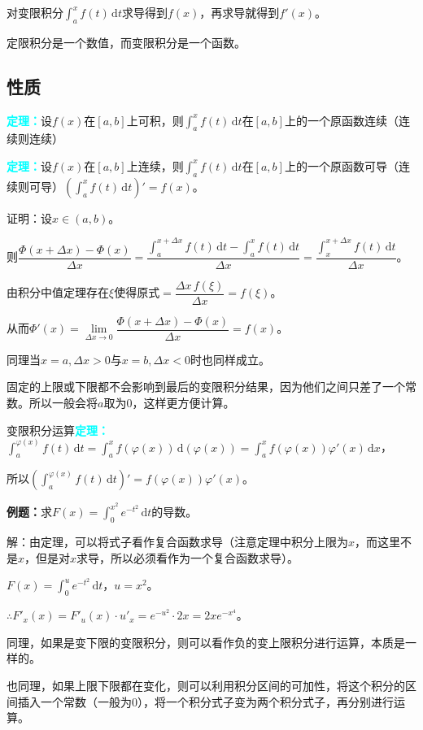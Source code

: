 \documentclass[UTF8, 12pt]{ctexart}
\begin{document}
对变限积分$\int_{a}^xf(t)\,\textrm{d}t$求导得到$f(x)$，再求导就得到$f'(x)$。

定限积分是一个数值，而变限积分是一个函数。

\subsection{性质}

\textcolor{aqua}{\textbf{定理：}}设$f(x)$在$[a,b]$上可积，则$\int_a^xf(t)\,\textrm{d}t$在$[a,b]$上的一个原函数连续（连续则连续）

\textcolor{aqua}{\textbf{定理：}}设$f(x)$在$[a,b]$上连续，则$\int_a^xf(t)\,\textrm{d}t$在$[a,b]$上的一个原函数可导（连续则可导）$(\int_a^xf(t)\,\textrm{d}t)'=f(x)$。

证明：设$x\in(a,b)$。

则$\dfrac{\Phi(x+\Delta x)-\Phi(x)}{\Delta x}=\dfrac{\int_a^{x+\Delta x}f(t)\,\textrm{d}t-\int_a^xf(t)\,\textrm{d}t}{\Delta x}=\dfrac{\int_x^{x+\Delta x}f(t)\,\textrm{d}t}{\Delta x}$。

由积分中值定理存在$\xi$使得原式$=\dfrac{\Delta x\,f(\xi)}{\Delta x}=f(\xi)$。

从而$\Phi'(x)=\lim\limits_{\Delta x\to 0}\dfrac{\Phi(x+\Delta x)-\Phi(x)}{\Delta x}=f(x)$。

同理当$x=a,\Delta x>0$与$x=b,\Delta x<0$时也同样成立。

固定的上限或下限都不会影响到最后的变限积分结果，因为他们之间只差了一个常数。所以一般会将$a$取为0，这样更方便计算。

变限积分运算\textcolor{aqua}{\textbf{定理：}}$\int_a^{\varphi(x)}f(t)\,\textrm{d}t=\int_a^xf(\varphi(x))\,\textrm{d}(\varphi(x))=\int_a^xf(\varphi(x))\varphi'(x)\,\textrm{d}x$，

所以$(\int_a^{\varphi(x)}f(t)\,\textrm{d}t)'=f(\varphi(x))\varphi'(x)$。

\textbf{例题：}求$F(x)=\int_0^{x^2}e^{-t^2}\,\textrm{d}t$的导数。

解：由定理，可以将式子看作复合函数求导（注意定理中积分上限为$x$，而这里不是$x$，但是对$x$求导，所以必须看作为一个复合函数求导）。

$F(x)=\int_0^ue^{-t^2}\,\textrm{d}t$，$u=x^2$。

$\therefore F'_x(x)=F'_u(x)\cdot u'_x=e^{-u^2}\cdot 2x=2xe^{-x^4}$。

同理，如果是变下限的变限积分，则可以看作负的变上限积分进行运算，本质是一样的。

也同理，如果上限下限都在变化，则可以利用积分区间的可加性，将这个积分的区间插入一个常数（一般为0），将一个积分式子变为两个积分式子，再分别进行运算。
\end{document}
